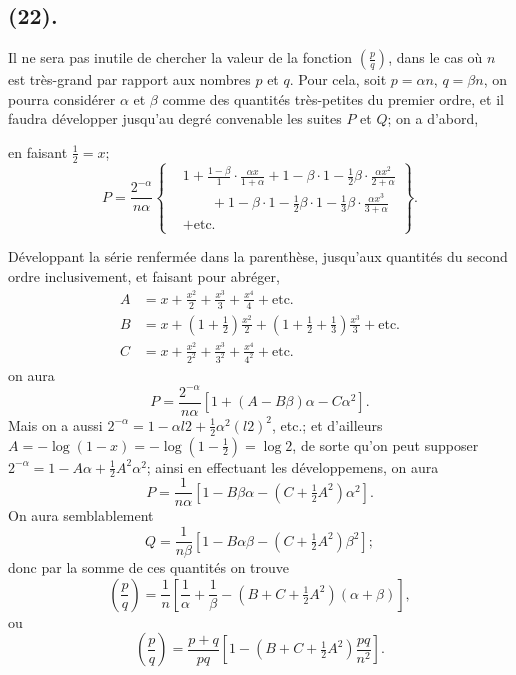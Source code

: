 \documentclass{article}
\begin{document}
\subsection*{(22).}

Il ne sera pas inutile de chercher la valeur de la fonction $\left(\frac{p}{q}\right)$, dans le cas où $n$ est très-grand par rapport aux nombres $p$ et $q$. Pour cela, soit $p=\alpha n$, $q=\beta n$, on pourra considérer $\alpha$ et $\beta$ comme des quantités très-petites du premier ordre, et il faudra développer jusqu'au degré convenable les suites $P$ et $Q$; on a d'abord,

en faisant $\frac{1}{2}=x$;
\[ P=\frac{2^{-\alpha}}{n\alpha}\left\{\begin{aligned} &1+\frac{1-\beta}{1}\cdot\frac{\alpha x}{1+\alpha}+1-\beta\cdot 1-\tfrac{1}{2}\beta\cdot\frac{\alpha x^{2}}{2+\alpha}\\ &\qquad+1-\beta\cdot 1-\tfrac{1}{2}\beta\cdot 1-\tfrac{1}{3}\beta\cdot\frac{\alpha x^{3}}{3+\alpha}\\ &+\text{etc.} \end{aligned}\right\}. \]

Développant la série renfermée dans la parenthèse, jusqu'aux quantités du second ordre inclusivement, et faisant pour abréger,
\[ \begin{aligned} A&=x+\frac{x^{2}}{2}+\frac{x^{3}}{3}+\frac{x^{4}}{4}+\text{etc.}\\ B&=x+\left(1+\tfrac{1}{2}\right)\frac{x^{2}}{2}+\left(1+\tfrac{1}{2}+\tfrac{1}{3}\right)\frac{x^{3}}{3}+\text{etc.}\\ C&=x+\frac{x^{2}}{2^{2}}+\frac{x^{3}}{3^{2}}+\frac{x^{4}}{4^{2}}+\text{etc.} \end{aligned} \]
on aura
\[ P=\frac{2^{-\alpha}}{n\alpha}\left[1+(A-B\beta)\alpha-C\alpha^{2}\right]. \]
Mais on a aussi $2^{-\alpha}=1-\alpha l2+\frac{1}{2}\alpha^{2}(l2)^{2}$, etc.; et d'ailleurs $A=-\log(1-x)=-\log\left(1-\frac{1}{2}\right)=\log 2$, de sorte qu'on peut supposer $2^{-\alpha}=1-A\alpha+\frac{1}{2}A^{2}\alpha^{2}$; ainsi en effectuant les développemens, on aura
\[ P=\frac{1}{n\alpha}\left[1-B\beta\alpha-\left(C+\tfrac{1}{2}A^{2}\right)\alpha^{2}\right]. \]
On aura semblablement
\[ Q=\frac{1}{n\beta}\left[1-B\alpha\beta-\left(C+\tfrac{1}{2}A^{2}\right)\beta^{2}\right]; \]
donc par la somme de ces quantités on trouve
\[ \left(\frac{p}{q}\right)=\frac{1}{n}\left[\frac{1}{\alpha}+\frac{1}{\beta}-\left(B+C+\tfrac{1}{2}A^{2}\right)(\alpha+\beta)\right], \]
ou
\[ \left(\frac{p}{q}\right)=\frac{p+q}{pq}\left[1-\left(B+C+\tfrac{1}{2}A^{2}\right)\frac{pq}{n^{2}}\right]. \]
\end{document}
